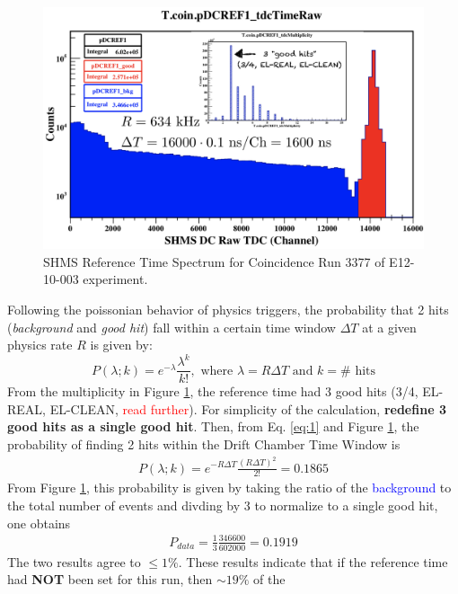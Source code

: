 \documentclass[14pt]{article}
\begin{document}
\begin{figure}[H]
  \centering
  \captionsetup{justification=raggedright,singlelinecheck=false}
  \includegraphics[scale=0.3]{plots/pDCREF_Prob.png}
  \caption{SHMS Reference Time Spectrum for Coincidence Run 3377 of E12-10-003 experiment.}
  \label{fig:pDCref_time_prob}
\end{figure}
Following the poissonian behavior of physics triggers, the probability that 2 hits (\textit{background} and \textit{good hit}) fall within a certain
time window $\Delta T$ at a given physics rate $R$ is given by:
\begin{equation}
  P(\lambda; k) = e^{-\lambda}\frac{\lambda^{k}}{k!}, \text{ where $\lambda=R \Delta T$ and $k=\# \text{ hits}$}
  \label{eq:1}
\end{equation}
From the multiplicity in Figure \ref{fig:pDCref_time_prob}, the reference time had 3 good hits (3/4, EL-REAL, EL-CLEAN, \textcolor{red}{read further}).
For simplicity of the calculation, \textbf{redefine 3 good hits as a single good hit}. Then, from Eq. \ref{eq:1} and Figure \ref{fig:pDCref_time_prob},
the probability of finding 2 hits within the Drift Chamber Time Window is
\begin{align}
  P(\lambda;k) = e^{-R\Delta T}\frac{(R\Delta T)^{2}}{2!} = 0.1865
\end{align}
From Figure \ref{fig:pDCref_time_prob}, this probability is given by taking the ratio of the \textcolor{blue}{background} to the total number of events and divding by
3 to normalize to a single good hit, one obtains
\begin{align}
  P_{data} = \frac{1}{3}\frac{346600}{602000} = 0.1919
\end{align}
The two results agree to $\leq 1\% $. These results indicate that if the reference time had \textbf{NOT} been set for this run, then $\sim 19\%$ of the
\end{document}
